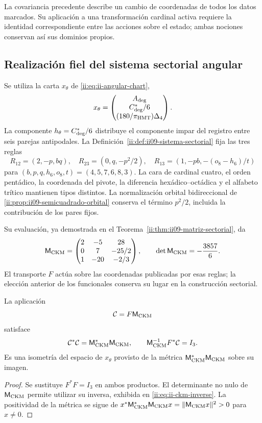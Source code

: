 La covariancia precedente describe un cambio de coordenadas de todos los
datos marcados. Su aplicación a una transformación cardinal activa requiere
la identidad correspondiente entre las acciones sobre el estado; ambas
nociones conservan así sus dominios propios.

\subsection{Realización fiel del sistema sectorial angular}

Se utiliza la carta \(x_\theta\) de
\eqref{ii:eq:ii-angular-chart},
\[
 x_\theta=\begin{pmatrix}A_{\rm deg}\\C^*_{\rm deg}/6\\
                              (180/\pi_{\rm HMT})\Delta_4\end{pmatrix}.
\]
La componente \(h_\theta=C^*_{\rm deg}/6\) distribuye el componente
impar del registro entre seis parejas antipodales. La
Definición~\ref{ii:def:ii09-sistema-sectorial} fija las tres reglas
\[
 R_{12}=(2,-p,bq),\quad R_{23}=(0,q,-p^2/2),\quad
 R_{13}=(1,-pb,-(o_8-h_6)/t)
\]
para \((b,p,q,h_6,o_8,t)=(4,5,7,6,8,3)\). La cara de cardinal
cuatro, el orden pentádico, la coordenada del pivote, la diferencia
hexádico--octádica y el alfabeto trítico mantienen tipos distintos.
La normalización orbital bidireccional de
\ref{ii:prop:ii09-semicuadrado-orbital} conserva el término \(p^2/2\),
incluida la contribución de los pares fijos.

Su evaluación, ya demostrada en el
Teorema~\ref{ii:thm:ii09-matriz-sectorial}, da
\[
 \mathsf M_{\rm CKM}=
 \begin{pmatrix}2&-5&28\\0&7&-25/2\\1&-20&-2/3\end{pmatrix},
 \qquad\det\mathsf M_{\rm CKM}=-\frac{3857}{6}.
\]
El transporte \(F\) actúa sobre las coordenadas publicadas por esas
reglas; la elección anterior de los funcionales conserva su lugar en la
construcción sectorial.

\begin{corollary}
\label{ii:cor:ii-witt-composed-reader}
La aplicación
\begin{equation}
 \mathcal C=F\mathsf M_{\rm CKM}
 \label{ii:eq:ii-witt-composed-reader}
\end{equation}
satisface
\[
 \mathcal C^*\mathcal C=\mathsf M_{\rm CKM}^*\mathsf M_{\rm CKM},
 \qquad
 \mathsf M_{\rm CKM}^{-1}F^*\mathcal C=I_3.
\]
Es una isometría del espacio de \(x_\theta\) provisto de la métrica
\(\mathsf M_{\rm CKM}^*\mathsf M_{\rm CKM}\) sobre su imagen.
\end{corollary}
\begin{proof}
Se sustituye \(F^*F=I_3\) en ambos productos. El determinante no
nulo de \(\mathsf M_{\rm CKM}\) permite utilizar su inversa,
exhibida en \eqref{ii:eq:ii-ckm-inverse}. La positividad de la métrica
se sigue de
\(x^*\mathsf M_{\rm CKM}^*\mathsf M_{\rm CKM}x
=\|\mathsf M_{\rm CKM}x\|^2>0\) para \(x\ne0\).
\end{proof}

